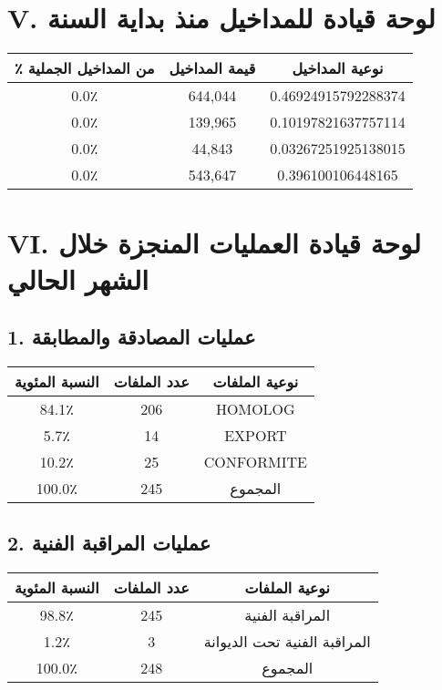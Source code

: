 \documentclass[a4paper,12pt]{article}
\begin{document}
\section*{V. لوحة قيادة للمداخيل منذ بداية السنة}
\begin{tabular}{ccc}
\toprule
\textbf{٪ من المداخيل الجملية} & \textbf{قيمة المداخيل} & \textbf{نوعية المداخيل} \\
\midrule
0.0٪ & 644,044 & 0.46924915792288374 \\
0.0٪ & 139,965 & 0.10197821637757114 \\
0.0٪ & 44,843 & 0.03267251925138015 \\
0.0٪ & 543,647 & 0.396100106448165 \\

\bottomrule
\end{tabular}

\section*{VI. لوحة قيادة العمليات المنجزة خلال الشهر الحالي}
\subsection*{1. عمليات المصادقة والمطابقة}
\begin{tabular}{ccc}
\toprule
\textbf{النسبة المئوية} & \textbf{عدد الملفات} & \textbf{نوعية الملفات} \\
\midrule
84.1٪ & 206 & HOMOLOG \\
5.7٪ & 14 & EXPORT \\
10.2٪ & 25 & CONFORMITE \\
100.0٪ & 245 & المجموع \\

\bottomrule
\end{tabular}

\subsection*{2. عمليات المراقبة الفنية}
\begin{tabular}{ccc}
\toprule
\textbf{النسبة المئوية} & \textbf{عدد الملفات} & \textbf{نوعية الملفات} \\
\midrule
98.8٪ & 245 & المراقبة الفنية \\
1.2٪ & 3 & المراقبة الفنية تحت الديوانة \\
100.0٪ & 248 & المجموع \\

\bottomrule
\end{tabular}
\end{document}
